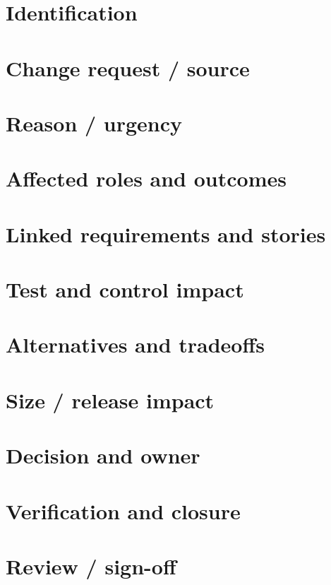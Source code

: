 \documentclass[11pt,letterpaper]{article}
\begin{document}
\section{Identification}
\section{Change request / source}
\section{Reason / urgency}
\section{Affected roles and outcomes}
\section{Linked requirements and stories}
\section{Test and control impact}
\clearpage
\section{Alternatives and tradeoffs}
\section{Size / release impact}
\section{Decision and owner}
\section{Verification and closure}
\clearpage
\section{Review / sign-off}
\end{document}
